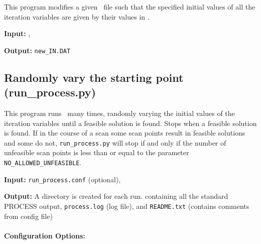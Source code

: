 This program modifies a given \indat\ file such that the specified initial values of all the iteration variables are given by their values in \outdat.

\begin{description}
\item{\textbf{Input:}}
\indat, \mfile\

\item{\textbf{Output:}}
\texttt{new\_IN.DAT}
\end{description}

\subsection{Randomly vary the starting point (run\_process.py)}
\label{subsec:run_process}
This program runs \process\ many times, randomly varying the initial values of the iteration variables until a feasible solution is found.  Stops when a feasible solution is found.  If in the course of a scan some scan points result in feasible solutions and some do not, \texttt{run\_process.py} will stop if and only if the number of unfeasible scan points is less than or equal to the parameter \texttt{NO\_ALLOWED\_UNFEASIBLE}.

\begin{description}
\item{\textbf{Input:}}
\texttt{run\_process.conf} (optional), \indat\

\item{\textbf{Output:}} A directory is created for each run. containing all the standard
  PROCESS output, \texttt{process.log} (log file), and \texttt{README.txt}
  (contains comments from config file)
\end{description}

\paragraph{Configuration Options:}


